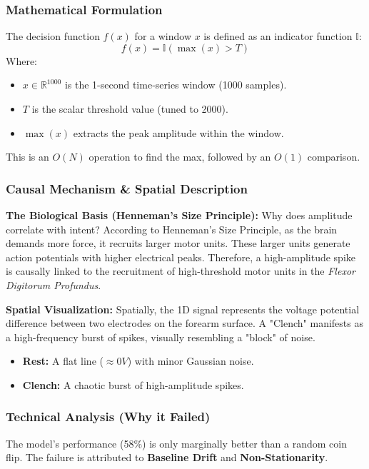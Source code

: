 \documentclass{article}
\begin{document}
\subsubsection{Mathematical Formulation}
The decision function $f(x)$ for a window $x$ is defined as an indicator function $\mathbb{I}$:
\begin{equation}
    f(x) = \mathbb{I}(\max(x) > T)
\end{equation}
Where:
\begin{itemize}
    \item $x \in \mathbb{R}^{1000}$ is the 1-second time-series window (1000 samples).
    \item $T$ is the scalar threshold value (tuned to 2000).
    \item $\max(x)$ extracts the peak amplitude within the window.
\end{itemize}
This is an $O(N)$ operation to find the max, followed by an $O(1)$ comparison.

\subsubsection{Causal Mechanism \& Spatial Description}
\textbf{The Biological Basis (Henneman's Size Principle):}
Why does amplitude correlate with intent? According to Henneman's Size Principle, as the brain demands more force, it recruits larger motor units. These larger units generate action potentials with higher electrical peaks. Therefore, a high-amplitude spike is causally linked to the recruitment of high-threshold motor units in the \textit{Flexor Digitorum Profundus}.

\textbf{Spatial Visualization:}
Spatially, the 1D signal represents the voltage potential difference between two electrodes on the forearm surface. A "Clench" manifests as a high-frequency burst of spikes, visually resembling a "block" of noise.
\begin{itemize}
    \item \textbf{Rest:} A flat line ($\approx 0V$) with minor Gaussian noise.
    \item \textbf{Clench:} A chaotic burst of high-amplitude spikes.
\end{itemize}

\subsubsection{Technical Analysis (Why it Failed)}
The model's performance (58\%) is only marginally better than a random coin flip. The failure is attributed to \textbf{Baseline Drift} and \textbf{Non-Stationarity}.
\end{document}
